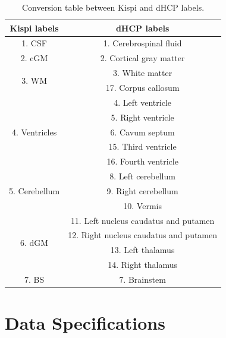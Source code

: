 \begin{table}[hbtp]
    \centering
    \begin{tabular}{c|c}
        \toprule
        \textbf{Kispi labels} & \textbf{dHCP labels} \\
        \midrule
        1. CSF & 1. Cerebrospinal fluid \\ \hline
        2. cGM & 2. Cortical gray matter \\ \hline
        \multirow{2}{*}{3. WM} & 3. White matter \\
         & 17. Corpus callosum \\ \hline
        \multirow{5}{*}{4. Ventricles} & 4. Left ventricle \\
         & 5. Right ventricle \\
         & 6. Cavum septum \\
         & 15. Third ventricle \\
         & 16. Fourth ventricle \\ \hline
        \multirow{3}{*}{5. Cerebellum} & 8. Left cerebellum \\
         & 9. Right cerebellum \\
         & 10. Vermis \\ \hline
        \multirow{4}{*}{6. dGM} & 11. Left nucleus caudatus and putamen \\
         & 12. Right nucleus caudatus and putamen \\
         & 13. Left thalamus \\
         & 14. Right thalamus \\ \hline
        7. BS & 7. Brainstem \\
        \bottomrule
    \end{tabular}
    \caption{Conversion table between Kispi and dHCP labels.}
    \label{tab:label_merge}
\end{table}

\section{Data Specifications}
